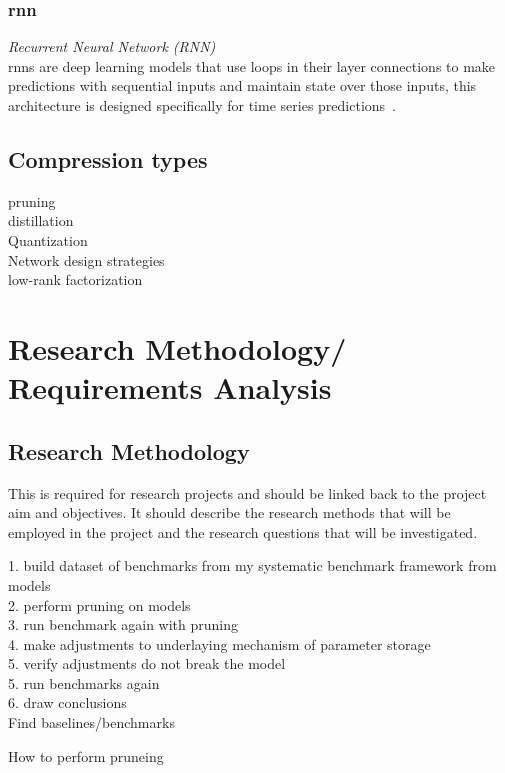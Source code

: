 \documentclass[11pt]{article}
\begin{document}
\subsubsection{\Acrlong*{rnn}}
\emph{
    Recurrent Neural Network (RNN)\\
}
\acrshort{rnn}s are deep learning models that use loops in their layer connections to make predictions with sequential inputs and maintain state over those inputs, this architecture is designed specifically for time series predictions~\autocite{chenDeepLearningEdge2019}.



\subsection{Compression types}\label{subsec:compressionTypes}
pruning\\
distillation\\
Quantization\\
Network design strategies\\
low-rank factorization\\

\pagebreak
\section{Research Methodology/ Requirements Analysis}
\subsection{Research Methodology}
This is required for research projects and should be linked
back to the project aim and objectives. It should describe the research methods that
will be employed in the project and the research questions that will be investigated.


1. build dataset of benchmarks from my systematic benchmark framework from models\\
2. perform pruning on models\\
3. run benchmark again with pruning\\
4. make adjustments to underlaying mechanism of parameter storage\\
5. verify adjustments do not break the model\\
5. run benchmarks again\\
6. draw conclusions\\

Find baselines/benchmarks

How to perform pruneing
\end{document}
